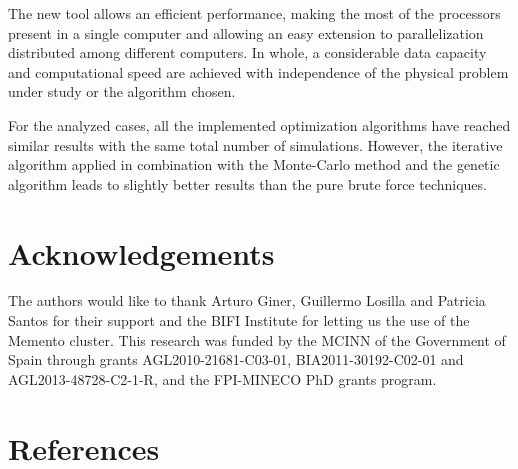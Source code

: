 \documentclass[review,authoryear]{elsarticle}
\begin{document}
The new tool allows an efficient performance, making the most of the processors present in a single computer and allowing an easy extension to parallelization distributed among different computers. In whole, a considerable data capacity and computational speed are achieved with independence of the physical problem under study or the algorithm chosen.

For the analyzed cases, all the implemented optimization algorithms have reached similar results with the same total number of simulations. However, the iterative algorithm applied in combination with the Monte-Carlo method and the genetic algorithm leads to slightly better results than the pure brute force techniques.

\section*{Acknowledgements}

The authors would like to thank Arturo Giner, Guillermo Losilla and Patricia
Santos for their support and the BIFI Institute for letting us the use of the
Memento cluster. This research was funded by the MCINN of the Government of
Spain through grants AGL2010-21681-C03-01, BIA2011-30192-C02-01 and
AGL2013-48728-C2-1-R, and the FPI-MINECO PhD grants program.

\section*{References}

\end{document}
